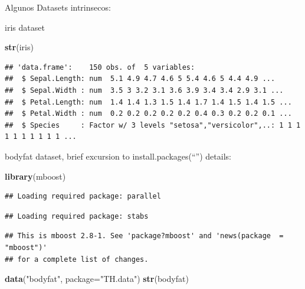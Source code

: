 \documentclass[ignorenonframetext,]{beamer}
\newenvironment{Shaded}{\begin{snugshade}}{\end{snugshade}}
\newcommand{\KeywordTok}[1]{\textcolor[rgb]{0.13,0.29,0.53}{\textbf{#1}}}
\newcommand{\DataTypeTok}[1]{\textcolor[rgb]{0.13,0.29,0.53}{#1}}
\newcommand{\StringTok}[1]{\textcolor[rgb]{0.31,0.60,0.02}{#1}}
\newcommand{\NormalTok}[1]{#1}
\begin{document}
\begin{frame}[fragile]{Algunos Datasets intrinsecos:}

iris dataset

\begin{Shaded}
\begin{Highlighting}[]
\KeywordTok{str}\NormalTok{(iris)}
\end{Highlighting}
\end{Shaded}

\begin{verbatim}
## 'data.frame':    150 obs. of  5 variables:
##  $ Sepal.Length: num  5.1 4.9 4.7 4.6 5 5.4 4.6 5 4.4 4.9 ...
##  $ Sepal.Width : num  3.5 3 3.2 3.1 3.6 3.9 3.4 3.4 2.9 3.1 ...
##  $ Petal.Length: num  1.4 1.4 1.3 1.5 1.4 1.7 1.4 1.5 1.4 1.5 ...
##  $ Petal.Width : num  0.2 0.2 0.2 0.2 0.2 0.4 0.3 0.2 0.2 0.1 ...
##  $ Species     : Factor w/ 3 levels "setosa","versicolor",..: 1 1 1 1 1 1 1 1 1 1 ...
\end{verbatim}

bodyfat dataset, brief excursion to install.packages(``'') details:

\begin{Shaded}
\begin{Highlighting}[]
\KeywordTok{library}\NormalTok{(mboost)}
\end{Highlighting}
\end{Shaded}

\begin{verbatim}
## Loading required package: parallel
\end{verbatim}

\begin{verbatim}
## Loading required package: stabs
\end{verbatim}

\begin{verbatim}
## This is mboost 2.8-1. See 'package?mboost' and 'news(package  = "mboost")'
## for a complete list of changes.
\end{verbatim}

\begin{Shaded}
\begin{Highlighting}[]
\KeywordTok{data}\NormalTok{(}\StringTok{"bodyfat"}\NormalTok{, }\DataTypeTok{package=}\StringTok{"TH.data"}\NormalTok{)}
\KeywordTok{str}\NormalTok{(bodyfat)}
\end{Highlighting}
\end{Shaded}


\end{frame}
\end{document}
